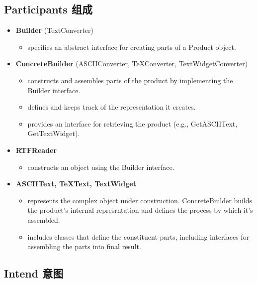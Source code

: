 \subsection{Participants 组成}

\begin{itemize}
\small
\item \textbf{Builder} (TextConverter)

	\begin{itemize}
		\item specifies an abstract interface for creating parts of a Product object.
	\end{itemize}

\item \textbf{ConcreteBuilder} (ASCIIConverter, TeXConverter, TextWidgetConverter)

	\begin{itemize}
		\item constructs and assembles parts of the product by implementing the Builder interface.

		\item defines and keeps track of the representation it creates.

		\item provides an interface for retrieving the product (e.g., GetASCIIText, GetTextWidget).
	\end{itemize}

\item \textbf{RTFReader}

	\begin{itemize}
		\item constructs an object using the Builder interface.
	\end{itemize}

\item \textbf{ASCIIText, TeXText, TextWidget}

	\begin{itemize}
		\item represents the complex object under construction. ConcreteBuilder builds the product's internal represrntation and defines the process by which it's assembled.

		\item includes classes that define the constituent parts, including interfaces for assembling the parts into final result.
	\end{itemize}
\normalize
\end{itemize}

\subsection{Intend 意图}

